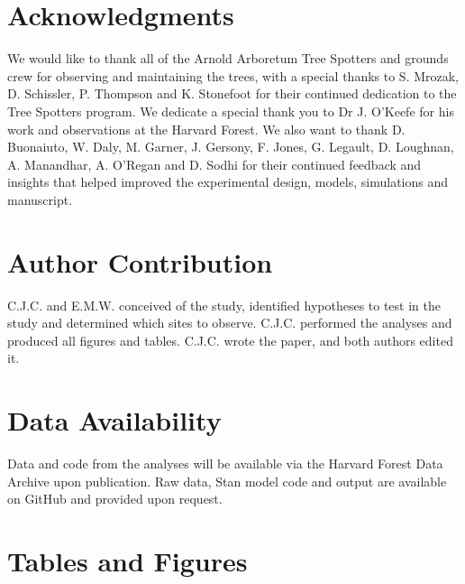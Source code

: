 \documentclass{article}\usepackage[]{graphicx}\usepackage[]{color}
\begin{document}
\section*{Acknowledgments}
We would like to thank all of the Arnold Arboretum Tree Spotters and grounds crew for observing and maintaining the trees, with a special thanks to S. Mrozak, D. Schissler, P. Thompson and K. Stonefoot for their continued dedication to the Tree Spotters program. We dedicate a special thank you to Dr J. O'Keefe for his work and observations at the Harvard Forest. We also want to thank D. Buonaiuto, W. Daly, M. Garner, J. Gersony, F. Jones, G. Legault, D. Loughnan, A. Manandhar, A. O'Regan and D. Sodhi for their continued feedback and insights that helped improved the experimental design, models, simulations and manuscript. 

\section*{Author Contribution} 
C.J.C. and E.M.W. conceived of the study, identified hypotheses to test in the study and determined which sites to observe. C.J.C. performed the analyses and produced all figures and tables. C.J.C. wrote the paper, and both authors edited it.

\section*{Data Availability}
Data and code from the analyses will be available via the Harvard Forest Data Archive upon publication. Raw data, {Stan} model code and output are available on GitHub and provided upon request.




\section*{Tables and Figures}
\end{document}
